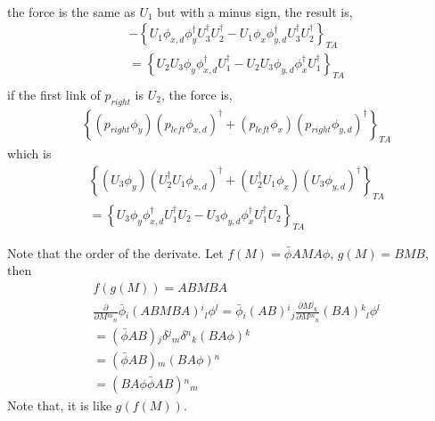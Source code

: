 \begin{tcolorbox}
\begin{equation}
\begin{split}
\end{split}
\end{equation}
the force is the same as $U_1$ but with a minus sign, the result is,
\begin{equation}
\begin{split}
&-\left\{U_1\phi_{x,d}\phi_{y}^{\dagger}U_3^{\dagger}U_2^{\dagger}-U_1\phi_{x}\phi_{y,d}^{\dagger}U_3^{\dagger}U_2^{\dagger}\right\}_{TA}\\
&=\left\{U_2U_3\phi_{y}\phi_{x,d}^{\dagger}U_1^{\dagger}-U_2U_3\phi_{y,d}\phi_{x}^{\dagger}U_1^{\dagger}\right\}_{TA}\\
\end{split}
\end{equation}
if the first link of $p_{right}$ is $U_2$, the force is,
\begin{equation}
\begin{split}
&\left\{\left(p_{right}\phi_{y}\right)\left(p_{left}\phi_{x,d}\right)^{\dagger}+\left(p_{left}\phi_{x}\right)\left(p_{right}\phi_{y,d}\right)^{\dagger}\right\}_{TA}
\end{split}
\end{equation}
which is
\begin{equation}
\begin{split}
&\left\{\left(U_3\phi_{y}\right)\left(U_2^{\dagger}U_1\phi_{x,d}\right)^{\dagger}+\left(U_2^{\dagger}U_1\phi_{x}\right)\left(U_3\phi_{y,d}\right)^{\dagger}\right\}_{TA}\\
&=\left\{U_3\phi_{y}\phi_{x,d}^{\dagger}U_1^{\dagger}U_2-U_3\phi_{y,d}\phi_{x}^{\dagger}U_1^{\dagger}U_2\right\}_{TA}
\end{split}
\end{equation}

\end{tcolorbox}


\textcolor[rgb]{1,0,0}{
Note that the order of the derivate. Let $f(M)=\bar{\phi}AMA\phi$, $g(M)=BMB$, then
\begin{equation}
\begin{split}
&f(g(M))=ABMBA\\
&\frac{\partial }{\partial M{}^m{}_n}\bar{\phi}{}_i(ABMBA){}^i{}_l\phi{}^l=\bar{\phi}{}_i(AB){}^i{}_j \frac{\partial M{}^j{}_k}{\partial M{}^m{}_n}(BA){}^k{}_l\phi{}^l\\
&=(\bar{\phi}AB){}_j \delta {}^j{}_m \delta {}^n{}_k(BA\phi){}^k\\
&=(\bar{\phi}AB){}_m (BA\phi){}^n\\
&=(BA\phi \bar{\phi}AB){}^n{}_m
\end{split}
\end{equation}
Note that, it is like $g(f(M))$.
}

